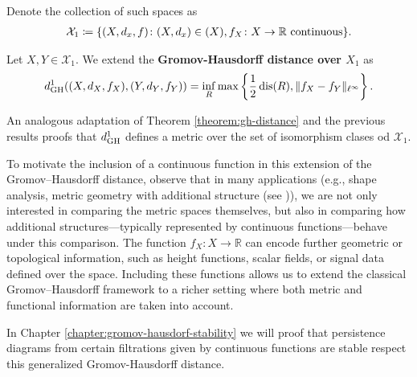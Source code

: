 Denote the collection of such spaces as
\begin{align}
    \mathcal{X}_1 \coloneq \{ (X, d_x, f) \colon (X, d_x) \in \mathcal(X), f_X \colon X \to \mathbb R \text{ continuous}\}.
\end{align}

\begin{definition} \label{def:dgh1}
    Let $ X, Y \in \mathcal{X}_1 $. We extend the {\bf Gromov-Hausdorff distance over $ X_1 $} as
    \begin{equation}
        d_{\operatorname{GH}}^1((X, d_X, f_X), (Y, d_Y, f_Y)) = \inf_{R} \max \left\{ \frac{1}{2} \operatorname{dis}(R), \|f_X - f_Y \|_{\ell^\infty} \right\}.   
    \end{equation}
\end{definition}

An analogous adaptation of Theorem \ref{theorem:gh-distance} and the previous results proofs that $ d_{\operatorname{GH}}^1 $ defines a metric over the set of isomorphism clases od $ \mathcal{X}_1 $. 

To motivate the inclusion of a continuous function in this extension of the Gromov--Hausdorff distance, observe that in many applications (e.g., shape analysis, metric geometry with additional structure (see \cite{facundo})), we are not only interested in comparing the metric spaces themselves, but also in comparing how additional structures---typically represented by continuous functions---behave under this comparison. The function $f_X \colon X \to \mathbb{R}$ can encode further geometric or topological information, such as height functions, scalar fields, or signal data defined over the space. Including these functions allows us to extend the classical Gromov--Hausdorff framework to a richer setting where both metric and functional information are taken into account.

In Chapter \ref{chapter:gromov-hausdorf-stability} we will proof that persistence diagrams from certain filtrations given by continuous functions are stable respect this generalized Gromov-Hausdorff distance.